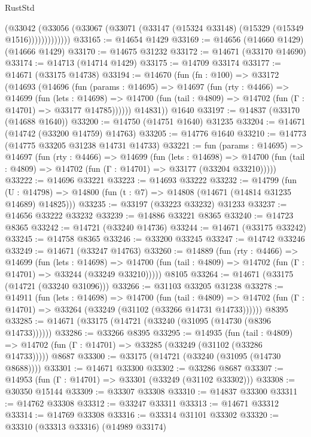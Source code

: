 \begin{lexlean}{RustStd}
\begin{coremodule}
                (@33042
                  (@33056 (@33067 (@33071 (@33147 (@15324 @33148) (@15329 (@15349 @1516)))))))))))))
@33165 := @14654 @1429
@33169 := @14656 (@14660 @1429) (@14666 @1429)
@33170 := @14675 @31232
@33172 := @14671 (@33170 @14690)
@33174 := @14713 (@14714 @1429)
@33175 := @14709 @33174
@33177 := @14671 (@33175 @14738)
@33194 := @14670
    (fun (fn : @100) =>
    @33172
      (@14693
        (@14696
          (fun (params : @14695) =>
          @14697
            (fun (rty : @4466) =>
            @14699
              (fun (lets : @14698) =>
              @14700 (fun (tail : @4809) => @14702 (fun (Γ : @14701) => @33177 @14785))))))
        @14831))
    @1640
@33197 := @14837 (@33170 (@14688 @1640))
@33200 := @14750 (@14751 @1640) @31235
@33204 := @14671 (@14742 (@33200 @14759) @14763)
@33205 := @14776 @1640
@33210 := @14773 (@14775 @33205 @31238 @14731 @14733)
@33221 := fun (params : @14695) =>
  @14697
    (fun (rty : @4466) =>
    @14699
      (fun (lets : @14698) =>
      @14700 (fun (tail : @4809) => @14702 (fun (Γ : @14701) => @33177 (@33204 @33210)))))
@33222 := @14696 @33221
@33223 := @14693 @33222
@33232 := @14799
    (fun (U : @14798) => @14800 (fun (t : @7) => @14808 (@14671 (@14814 @31235 @14689) @14825)))
@33235 := @33197 (@33223 @33232) @31233
@33237 := @14656 @33222 @33232
@33239 := @14886 @33221 @8365
@33240 := @14723 @8365
@33242 := @14721 (@33240 @14736)
@33244 := @14671 (@33175 @33242)
@33245 := @14758 @8365
@33246 := @33200 @33245
@33247 := @14742 @33246
@33249 := @14671 (@33247 @14763)
@33260 := @14889
    (fun (rty : @4466) =>
    @14699
      (fun (lets : @14698) =>
      @14700 (fun (tail : @4809) => @14702 (fun (Γ : @14701) => @33244 (@33249 @33210)))))
    @8105
@33264 := @14671 (@33175 (@14721 (@33240 @31096)))
@33266 := @31103 @33205 @31238
@33278 := @14911
    (fun (lets : @14698) =>
    @14700
      (fun (tail : @4809) =>
      @14702 (fun (Γ : @14701) => @33264 (@33249 (@31102 (@33266 @14731 @14733))))))
    @8395
@33285 := @14671 (@33175 (@14721 (@33240 (@31095 (@14730 (@8396 @14733))))))
@33286 := @33266 @8395
@33295 := @14935
    (fun (tail : @4809) => @14702 (fun (Γ : @14701) => @33285 (@33249 (@31102 (@33286 @14733)))))
    @8687
@33300 := @33175 (@14721 (@33240 (@31095 (@14730 @8688))))
@33301 := @14671 @33300
@33302 := @33286 @8687
@33307 := @14953 (fun (Γ : @14701) => @33301 (@33249 (@31102 @33302)))
@33308 := @30350 @15144
@33309 := @33307 @33308
@33310 := @14837 @33300
@33311 := @14762 @33308
@33312 := @33247 @33311
@33313 := @14671 @33312
@33314 := @14769 @33308
@33316 := @33314 @31101 @33302
@33320 := @33310 (@33313 @33316) (@14989 @33174)

\end{coremodule}
\end{lexlean}
